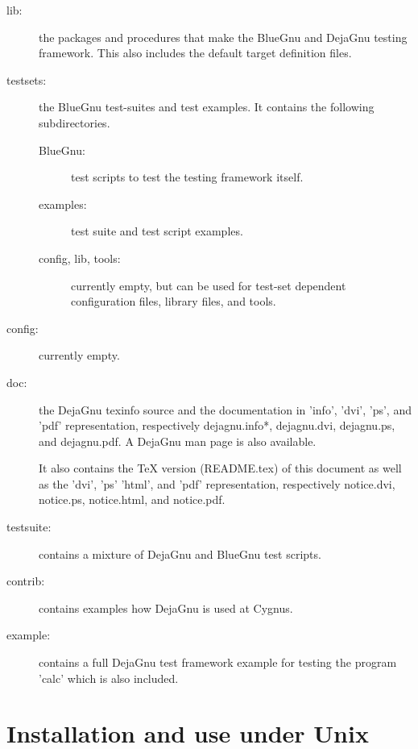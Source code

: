 \begin{description}
\item[lib:] the packages and procedures that make the BlueGnu and
DejaGnu testing framework. This also includes the default target
definition files.

\item[testsets:] the BlueGnu test-suites and test examples. It contains
the following subdirectories.

\begin{description}
\item[BlueGnu:]
test scripts to test the testing framework itself.

\item[examples:]
test suite and test script examples.

\item[config, lib, tools:]
currently empty, but can be used for
test-set dependent configuration files, library files, and tools.
\end{description}

\item[config:]
currently empty.

\item[doc:] the DejaGnu texinfo source and the documentation in
'info', 'dvi', 'ps', and 'pdf' representation, respectively
dejagnu.info*, dejagnu.dvi, dejagnu.ps, and dejagnu.pdf. A DejaGnu man
page is also available.

It also contains
the \TeX{} version (README.tex) of this document as well as the 'dvi', 'ps'
'html', and 'pdf' representation, respectively notice.dvi, notice.ps,
notice.html, and notice.pdf.

\item[testsuite:] contains a mixture of DejaGnu and BlueGnu test
scripts.

\item[contrib:] contains examples how DejaGnu is used at Cygnus.

\item[example:] contains a full DejaGnu test framework example for testing the program 'calc' which is also included.

\end{description}

\section{Installation and use under Unix}

